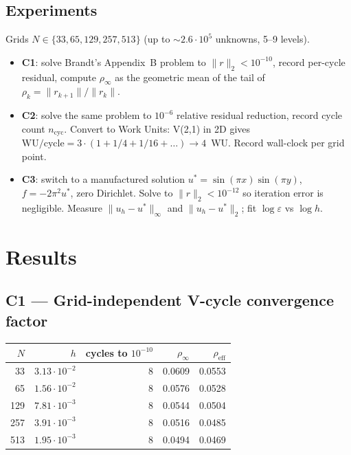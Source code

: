 \documentclass[11pt]{article}
\begin{document}
\subsection{Experiments}
Grids $N \in \{33, 65, 129, 257, 513\}$ (up to $\sim 2.6 \cdot 10^5$ unknowns, 5--9 levels).

\begin{itemize}
\item \textbf{C1}: solve Brandt's Appendix~B problem to $\|r\|_2 < 10^{-10}$, record per-cycle residual, compute $\rho_\infty$ as the geometric mean of the tail of $\rho_k = \|r_{k+1}\|/\|r_k\|$.
\item \textbf{C2}: solve the same problem to $10^{-6}$ relative residual reduction, record cycle count $n_{\text{cyc}}$. Convert to Work Units: V(2,1) in 2D gives $\text{WU/cycle} = 3 \cdot (1 + 1/4 + 1/16 + \dots) \to 4$~WU. Record wall-clock per grid point.
\item \textbf{C3}: switch to a manufactured solution $u^* = \sin(\pi x) \sin(\pi y)$, $f = -2\pi^2 u^*$, zero Dirichlet. Solve to $\|r\|_2 < 10^{-12}$ so iteration error is negligible. Measure $\|u_h - u^*\|_\infty$ and $\|u_h - u^*\|_2$; fit $\log \varepsilon$ vs $\log h$.
\end{itemize}

\section{Results}

\subsection{C1 --- Grid-independent V-cycle convergence factor}

\begin{center}
\begin{tabular}{rrrrr}
\toprule
$N$ & $h$ & cycles to $10^{-10}$ & $\rho_\infty$ & $\rho_{\text{eff}}$ \\
\midrule
33  & $3.13 \cdot 10^{-2}$ & 8 & 0.0609 & 0.0553 \\
65  & $1.56 \cdot 10^{-2}$ & 8 & 0.0576 & 0.0528 \\
129 & $7.81 \cdot 10^{-3}$ & 8 & 0.0544 & 0.0504 \\
257 & $3.91 \cdot 10^{-3}$ & 8 & 0.0516 & 0.0485 \\
513 & $1.95 \cdot 10^{-3}$ & 8 & 0.0494 & 0.0469 \\
\bottomrule
\end{tabular}
\end{center}
\end{document}
